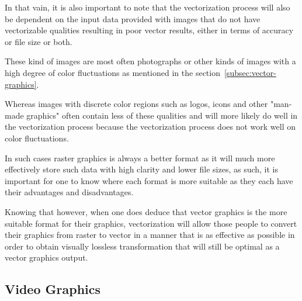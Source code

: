 \documentclass[12pt]{article}
\newcommand{\sentence}{} %
\renewcommand{\fullref}[1]{\ref{#1}\nameref{#1}}
\begin{document}
    \bigskip
    \sentence
    In that vain, it is also important to note that the vectorization process will also be dependent on the input
    data provided with images that do not have vectorizable qualities resulting in poor vector results, either in
    terms of accuracy or file size or both.
    \sentence
    These kind of images are most often photographs or other kinds of images with a high degree of color fluctuations
    as mentioned in the section~\fullref{subsec:vector-graphics}.
    \sentence
    Whereas images with discrete color regions such as logos, icons and other "man-made graphics" often contain less
    of these qualities and will more likely do well in the vectorization process because the vectorization process
    does not work well on color fluctuations.
    \sentence
    In such cases raster graphics is always a better format as it will much more effectively store such data with
    high clarity and lower file sizes, as such, it is important for one to know where each format is more suitable as
    they each have their advantages and disadvantages.
    \sentence
    Knowing that however, when one does deduce that vector graphics is the more suitable format for their graphics,
    vectorization will allow those people to convert their graphics from raster to vector in a manner that is as
    effective as possible in order to obtain visually lossless transformation that will still be optimal as a vector
    graphics output.

    \subsection{Video Graphics}\label{subsec:video-graphics}
\end{document}
